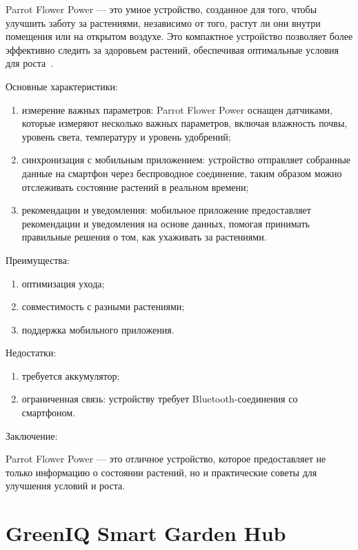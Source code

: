 Parrot Flower Power --- это умное устройство, созданное для того, чтобы улучшить заботу за растениями, независимо от того, растут ли они внутри помещения или на открытом воздухе. Это компактное устройство позволяет более эффективно следить за здоровьем растений, обеспечивая оптимальные условия для роста~\cite{ParrotFlowerPower}. 

Основные характеристики:

\begin{enumerate}
    \item измерение важных параметров: Parrot Flower Power оснащен датчиками, которые измеряют несколько важных параметров, включая влажность почвы, уровень света, температуру и уровень удобрений;
    \item синхронизация с мобильным приложением: устройство отправляет собранные данные на смартфон через беспроводное соединение, таким образом можно отслеживать состояние растений в реальном времени;
    \item рекомендации и уведомления: мобильное приложение предоставляет рекомендации и уведомления на основе данных, помогая принимать правильные решения о том, как ухаживать за растениями.
\end{enumerate}

Преимущества:

\begin{enumerate}
    \item оптимизация ухода;
    \item совместимость с разными растениями;
    \item поддержка мобильного приложения.
\end{enumerate}

Недостатки:

\begin{enumerate}
    \item требуется аккумулятор;
    \item ограниченная связь: устройству требует Bluetooth-соединения со смартфоном.
\end{enumerate}

Заключение:

Parrot Flower Power --- это отличное устройство, которое предоставляет не только информацию о состоянии растений, но и практические советы для улучшения условий и роста. 

\section{GreenIQ Smart Garden Hub}

